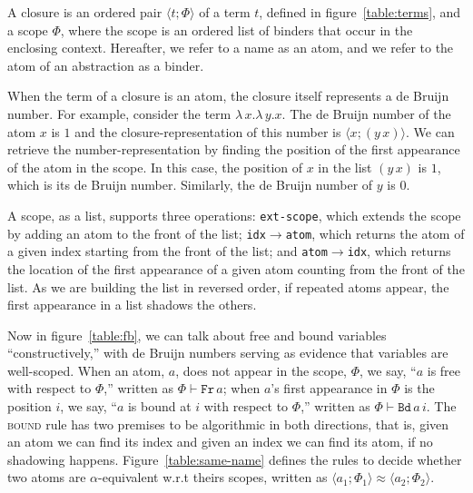 \documentclass[a4paper,UKenglish]{lipics-v2016}
\newcommand{\clos}[2] {
  \langle #1; #2 \rangle
}
\newcommand{\aeq}[4] {
  \clos{#1}{#2} \approx \clos{#3}{#4}
}
\newcommand*{\transname}[1]{\textsc{#1}}
\begin{document}


\begin{definition}
  A closure is an ordered pair $\clos{t}{\Phi}$ of a term $t$,
  defined in figure~\ref{table:terms},
  and a scope $\Phi$,
  where the scope is an ordered list of binders that occur in the enclosing context.
  Hereafter, we refer to a name as an atom, and we refer to the atom of an abstraction as a binder.
\end{definition}

When the term of a closure is an atom, the closure itself represents a
de Bruijn number.  For example, consider the term
$\lambda\,x.\lambda\,y.x$. The de Bruijn number of the atom $x$ is $1$
and the closure-representation of this number is $\clos{x}{(y\,x)}$.
We can retrieve the number-representation by finding the
position of the first appearance of the atom in the scope. In this
case, the position of $x$ in the list $(y\,x)$ is $1$, which is its de
Bruijn number. Similarly, the de Bruijn number of $y$ is $0$.

A scope, as a list, supports three operations:
\texttt{ext-scope}, which extends the scope by adding an atom to the front of the list;
\texttt{idx$\rightarrow$atom}, which returns the atom of a given index starting from the front of the list;
and \texttt{atom$\rightarrow$idx}, which returns the location of the first appearance of a given atom counting from the front of the list.
As we are building the list in reversed order, if repeated atoms appear, the first appearance in a list shadows the others.

Now in figure~\ref{table:fb}, we can talk about free and bound variables ``constructively,''
with de Bruijn numbers serving as evidence that variables are well-scoped.
When an atom, $a$, does not appear in the scope, $\Phi$,
we say, ``$a$ is free with respect to $\Phi$,'' written as $\Phi \vdash \texttt{Fr}\, a$;
when $a$'s first appearance in $\Phi$ is the position $i$,
we say, ``$a$ is bound at $i$ with respect to $\Phi$,'' written as $\Phi \vdash \texttt{Bd}\, a\,i$.
The \transname{bound} rule has two premises to be algorithmic in both directions,
that is, given an atom we can find its index
and given an index we can find its atom, if no shadowing happens.
Figure~\ref{table:same-name} defines the rules to decide whether two atoms are $\alpha$-equivalent w.r.t theirs scopes,
written as $\aeq{a_1}{\Phi_1}{a_2}{\Phi_2}$.
\end{document}
